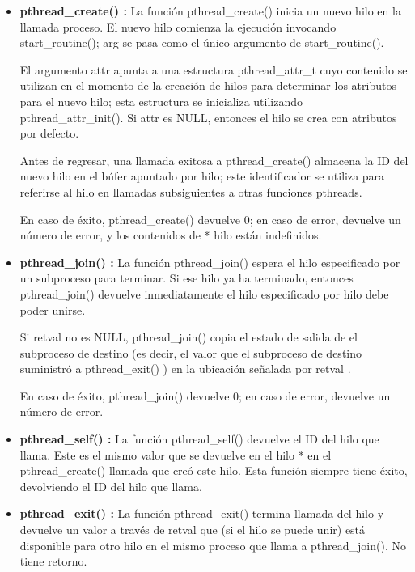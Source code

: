 \documentclass[12pt]{article}
\begin{document}
        \begin{itemize}
            \item[\Checkmark] \textbf{pthread\_create() :}
            La función pthread\_create() inicia un nuevo hilo en la llamada proceso. El nuevo hilo comienza la ejecución invocando start\_routine(); arg se pasa como el único argumento de start\_routine().
            
            El argumento attr apunta a una estructura pthread\_attr\_t cuyo contenido se utilizan en el momento de la creación de hilos para determinar los atributos para el nuevo hilo; esta estructura se inicializa utilizando pthread\_attr\_init(). Si attr es NULL, entonces el hilo se crea con atributos por defecto.

            Antes de regresar, una llamada exitosa a pthread\_create() almacena la ID del nuevo hilo en el búfer apuntado por hilo; este identificador se utiliza para referirse al hilo en llamadas subsiguientes a otras funciones pthreads.
            
            En caso de éxito, pthread\_create() devuelve 0; en caso de error, devuelve un número de error, y los contenidos de * hilo están indefinidos.
            
            \item[\Checkmark] \textbf{pthread\_join() :}
            La función pthread\_join() espera el hilo especificado por un subproceso para terminar. Si ese hilo ya ha terminado, entonces pthread\_join() devuelve inmediatamente el hilo especificado por hilo debe poder unirse.
            
            Si retval no es NULL, pthread\_join() copia el estado de salida de el subproceso de destino (es decir, el valor que el subproceso de destino suministró a pthread\_exit() ) en la ubicación señalada por retval . 
            
            En caso de éxito, pthread\_join() devuelve 0; en caso de error, devuelve un número de error.
            
             \item[\Checkmark] \textbf{pthread\_self() :}
             La función pthread\_self() devuelve el ID del hilo que llama.
             Este es el mismo valor que se devuelve en el hilo * en el pthread\_create() llamada que creó este hilo. Esta función siempre tiene éxito, devolviendo el ID del hilo que llama.
             
             \item[\Checkmark] \textbf{pthread\_exit() :}
             La función pthread\_exit() termina llamada del hilo y devuelve un valor a través de retval que (si el hilo se puede unir) está disponible para otro hilo en el mismo proceso que llama a pthread\_join(). No tiene retorno.
             

\end{itemize}
\end{document}
